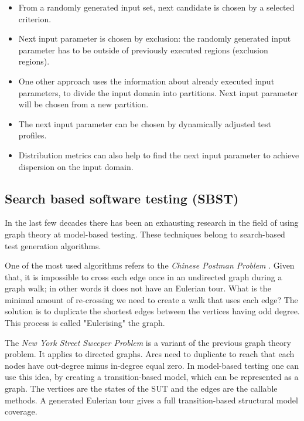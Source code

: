\begin{itemize}
	\item From a randomly generated input set, next candidate is chosen by a selected criterion.
	\item Next input parameter is chosen by exclusion: the randomly generated input parameter has to be outside of previously executed regions (exclusion regions).
	\item One other approach uses the information about already executed input parameters, to divide the input domain into partitions. Next input parameter will be chosen from a new partition.
	\item The next input parameter can be chosen by dynamically adjusted test profiles.
	\item Distribution metrics can also help to find the next input parameter to achieve dispersion on the input domain.
\end{itemize}


\subsection{Search based software testing (SBST)}
\label{sub:searchbasedtestgen}

In the last few decades there has been an exhausting research in the field of using graph theory at model-based testing. These techniques belong to search-based test generation algorithms.

One of the most used algorithms refers to the \textit{Chinese Postman Problem} \cite{graphtheorymbt}. Given that, it is impossible to cross each edge once in an undirected graph during a graph walk; in other words it does not have an Eulerian tour. What is the minimal amount of re-crossing we need to create a walk that uses each edge? The solution is to duplicate the shortest edges between the vertices having odd degree. This process is called "Eulerising" the graph.

The \textit{New York Street Sweeper Problem} is a variant of the previous graph theory problem. It applies to directed graphs. Arcs need to duplicate to reach that each nodes have out-degree minus in-degree equal zero. In model-based testing one can use this idea, by creating a transition-based model, which can be represented as a graph. The vertices are the states of the SUT and the edges are the callable methods. A generated Eulerian tour gives a full transition-based structural model coverage.

